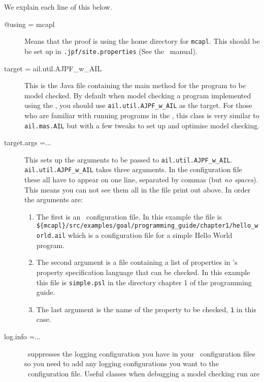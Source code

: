 We explain each line of this below.

\begin{sloppypar}
\begin{description}
\item[@using = mcapl] Means that the proof is using the home directory for \texttt{mcapl}.  This should be be set up in \texttt{.jpf/site.properties} (See the \mcapl\ manual).
\item[target = ail.util.AJPF\_w\_AIL] This is the Java file containing the main method for the program to be model checked.  By default when model checking a program implemented using the \ail, you should use \texttt{ail.util.AJPF\_w\_AIL} as the target.  For those who are familiar with running programs in the \ail, this class is very similar to \texttt{ail.mas.AIL} but with a few tweaks to set up and optimise model checking.
\item[target.args =...] This sets up the arguments to be passed to \texttt{ail.util.AJPF\_w\_AIL}.  \texttt{ail.util.AJPF\_w\_AIL} takes three arguments.  In the configuration file these all have to appear on one line, separated by commas (but \emph{no spaces}).  This means you can not see them all in the file print out above.  In order the arguments are:
\begin{enumerate}
\item The first is an \ail\ configuration file.  In this example the file is \texttt{\$\{mcapl\}/src/examples/goal/programming\_guide/chapter1/hello\_world.ail} which is a configuration file for a simple Hello World program.
\item The second argument is a file containing a list of properties in \ajpf's property specification language that can be checked.  In this example this file is \texttt{simple.psl} in the directory chapter 1 of the programming guide.
\item The last argument is the name of the property to be checked, \texttt{1} in this case.
\end{enumerate}
\item[log.info =... ] \jpf\ suppresses the logging configuration you have in your \ail\ configuration files so you need to add any logging configurations you want to the \jpf\ configuration file.  Useful classes when debugging a model checking run are


\end{description}
\end{sloppypar}
